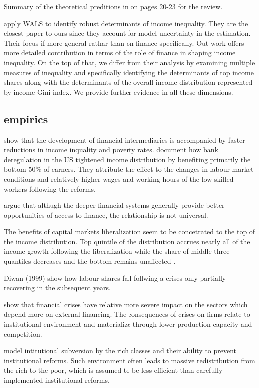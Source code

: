\documentclass[a4paper,11pt]{article}
\begin{document}
Summary of the theoretical preditions in \citet{demirgucc2009finance} on pages 20-23 for the review.

\citet{furceri2019robust} apply WALS to identify robust determinants of income inequality. They are the closest paper to ours since they account for model uncertainty in the estimation. Their focus if more general rathar than on finance specifically. Out work offers more detailed contribution in terms of the role of finance in shaping income inequality. On the top of that, we differ from their analysis by examining multiple measures of inequality and specifically identifying the determinants of top income shares along with the determinants of the overall income distribution represented by income Gini index. We provide further evidence in all these dimensions.

\subsection{empirics}
\citet{beck2007finance} show that the development of financial intermediaries is accompanied by faster reductions in income inquality and poverty rates.
\citet{beck2010big} document how bank deregulation in the US tightened income distribution by benefiting primarily the bottom 50\% of earners. They attribute the effect to the changes in labour market conditions and relatively higher wages and working hours of the low-skilled workers following the reforms.

\citet{claessens2007finance} argue that althugh the deeper financial systems generally provide better opportunities of access to finance, the relationship is not universal.

The benefits of capital markets liberalization seem to be concetrated to the top of the income distribution. Top quintile of the distribution accrues nearly all of the income growth following the liberalization while the share of middle three quantiles decreases and the bottom remains unaffected \citep{das2003income}.

Diwan (1999) show how labour shares fall follwing a crises only partially recovering in the subsequent years.

\citet{kroszneretal2007} show that financial crises have relative more severe impact on the sectors which depend more on external financing. The consequences of crises on firms relate to institutional environment and materialize through lower production capacity and competition.

\citet{glaeseretal2003} model intitutional subversion by the rich classes and their ability to prevent institutional reforms. Such environment often leads to massive redistribution from the rich to the poor, which is assumed to be less efficient than carefully implemented institutional reforms.

\clearpage
%


%
\end{document}

